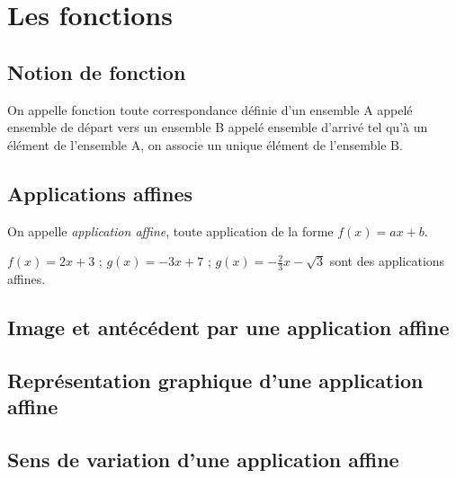 \documentclass[nocrop]{sesamanuel}
\begin{document}
\chapter{Les fonctions}
\cours
\section{Notion de fonction}
\begin{definition}
On appelle fonction toute correspondance définie d'un ensemble A appelé ensemble de départ vers un ensemble B appelé ensemble d'arrivé tel qu'à un élément de l'ensemble A, on associe un unique élément de l'ensemble B.
\end{definition}

\begin{exemple*1}

\end{exemple*1}

\section{Applications affines}
\begin{definition}
On appelle \emph{application affine}, toute application de la forme \emph{$f(x)=ax+b$}.
\begin{exemple*1}
$f(x)=2x+3$ \quad ; \quad $g(x)=-3x+7$ \quad ; \quad $g(x)=-\frac{2}{3}x-\sqrt{3}$ sont des applications affines.
\end{exemple*1}
\end{definition}

\section{Image et antécédent par une application affine}

\section{Représentation graphique d'une application affine}

\section{Sens de variation d'une application affine}
\end{document}
